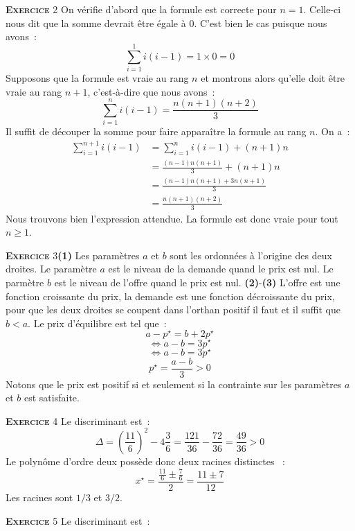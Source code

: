 \documentclass[10pt,a4paper,notitlepage]{article}
\newcommand{\exercice}[1]{\textsc{\textbf{Exercice}} #1}
\begin{document}
  \exercice{2} On vérifie d'abord que la formule est correcte pour $n=1$. Celle-ci nous dit que la somme devrait être égale à 0. C'est bien le cas puisque nous avons~:
  \[
    \sum_{i=1}^1  i(i-1) = 1 \times 0 = 0
  \]
  Supposons que la formule est vraie au rang $n$ et montrons alors qu'elle doit être vraie au rang $n+1$, c'est-à-dire que nous avons~:
  \[
    \sum_{i=1}^n  i(i-1) = \frac{n(n+1)(n+2)}{3}
  \]
  Il suffit de découper la somme pour faire apparaître la formule au rang $n$. On a~:
  \[
    \begin{split}
      \sum_{i=1}^{n+1}  i(i-1) &= \sum_{i=1}^{n}  i(i-1) + (n+1)n\\
                               &= \frac{(n-1)n(n+1)}{3} + (n+1)n\\
                               &= \frac{(n-1)n(n+1)+3n(n+1)}{3}\\
                               &= \frac{n(n+1)(n+2)}{3}
    \end{split}
  \]
  Nous trouvons bien l'expression attendue. La formule est donc vraie pour tout $n\geq 1$.

  \bigskip

  \exercice{3}\textbf{(1)} Les paramètres $a$ et $b$ sont les ordonnées à
  l'origine des deux droites. Le paramètre $a$ est le niveau de la demande quand
  le prix est nul. Le parmètre $b$ est le niveau de l'offre quand le prix est
  nul. \textbf{(2)}-\textbf{(3)} L'offre est une fonction croissante du prix, la
  demande est une fonction décroissante du prix, pour que les deux droites se
  coupent dans l'orthan positif il faut et il suffit que $b<a$. Le prix d'équilibre est tel que~:
  \[
    a - p^{\star} = b + 2p^{\star}
  \]
  \[
    \Leftrightarrow a-b = 3 p^{\star}
  \]
  \[
    \Leftrightarrow a-b = 3 p^{\star}
  \]
  \[
    p^{\star}=\frac{a-b}{3} > 0
  \]
  Notons que le prix est positif si et seulement si la contrainte sur les paramètres $a$ et $b$ est satisfaite.

  \bigskip

  \exercice{4} Le discriminant est~:
  \[
    \Delta = \left(\frac{11}{6}\right)^2-4\frac{3}{6} = \frac{121}{36}-\frac{72}{36} = \frac{49}{36}>0
  \]
  Le polynôme d'ordre deux possède donc deux racines distinctes ~:
  \[
    x^{\star} = \frac{\frac{11}{6}\pm \frac{7}{6}}{2} = \frac{11\pm 7}{12}
  \]
  Les racines sont $1/3$ et $3/2$.

  \bigskip

  \exercice{5} Le discriminant est~:
  
\end{document}
